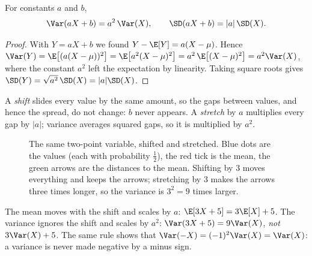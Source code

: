 \begin{rulebox}
For constants $a$ and $b$,
\[
  \Var(aX+b)=a^{2}\,\Var(X),\qquad \SD(aX+b)=|a|\,\SD(X).
\]
\end{rulebox}

\begin{proof}
With $Y=aX+b$ we found $Y-\E[Y]=a(X-\mu)$. Hence
$\Var(Y)=\E\bigl[(a(X-\mu))^2\bigr]=\E\bigl[a^2(X-\mu)^2\bigr]=a^2\,\E\bigl[(X-\mu)^2\bigr]=a^2\Var(X)$,
where the constant $a^2$ left the expectation by linearity. Taking square roots gives $\SD(Y)=\sqrt{a^2}\,\SD(X)=|a|\SD(X)$.
\end{proof}

\begin{keyidea}
A \emph{shift} slides every value by the same amount, so the gaps between values, and hence the spread, do not change: $b$ never appears. A \emph{stretch} by
$a$ multiplies every gap by $|a|$; variance averages squared gaps, so it is multiplied by $a^2$.
\end{keyidea}

\begin{figure}[h]
\centering
{}
\caption{The same two-point variable, shifted and stretched. Blue dots are the values (each with probability $\tfrac12$), the red tick is the mean, the green
arrows are the distances to the mean. Shifting by $3$ moves everything and keeps the arrows; stretching by $3$ makes the arrows three times longer, so the
variance is $3^2=9$ times larger.}
\end{figure}

\begin{commonmistake}
The mean moves with the shift and scales by $a$: $\E[3X+5]=3\E[X]+5$. The variance ignores the shift and scales by $a^2$:
$\Var(3X+5)=9\Var(X)$, \emph{not} $3\Var(X)+5$. The same rule shows that $\Var(-X)=(-1)^2\Var(X)=\Var(X)$: a variance is never made negative by a minus sign.
\end{commonmistake}

